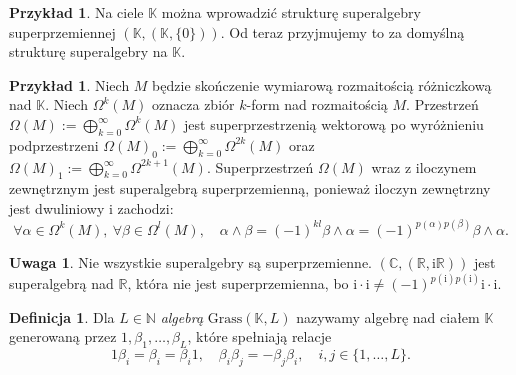 \documentclass[11pt,a4paper]{report}
\theoremstyle{definition}
\newtheorem{example}[theorem]{Przykład}
\newtheorem{definition}[theorem]{Definicja}
\newtheorem{remark}[theorem]{Uwaga}
\newcommand{\im}{\mathrm{i}}
\begin{document}
\begin{example}
 Na ciele $\mathbb{K}$ można wprowadzić strukturę superalgebry superprzemiennej $(\mathbb{K},(\mathbb{K},\{ 0 \}))$. Od teraz przyjmujemy to za domyślną strukturę superalgebry na $\mathbb{K}$.
\end{example}

\begin{example}
\label{superalgebra_form}
Niech $M$ będzie skończenie wymiarową rozmaitością różniczkową nad $\mathbb{K}$. Niech $\Omega^k(M)$ oznacza zbiór $k$-form nad rozmaitością $M$. Przestrzeń $\Omega(M) := \bigoplus_{k=0}^{\infty} \Omega^k(M)$ jest superprzestrzenią wektorową po wyróżnieniu podprzestrzeni $\Omega(M)_0 := \bigoplus_{k=0}^{\infty} \Omega^{2k}(M)$ oraz $\Omega(M)_1 := \bigoplus_{k=0}^{\infty} \Omega^{2k+1}(M)$. Superprzestrzeń $\Omega(M)$ wraz z iloczynem zewnętrznym jest superalgebrą superprzemienną, ponieważ iloczyn zewnętrzny jest dwuliniowy i zachodzi:
\begin{equation*}
\forall \alpha \in \Omega^{k}(M),\ \forall \beta \in \Omega^{l}(M), \quad \alpha \wedge \beta = (-1)^{kl} \beta \wedge \alpha = (-1)^{p(\alpha)p(\beta)} \beta \wedge \alpha.
\end{equation*}
\end{example}
\begin{remark}
Nie wszystkie superalgebry są superprzemienne. $(\mathbb{C},(\mathbb{R},\im \mathbb{R}))$ jest superalgebrą nad $\mathbb{R}$, która nie jest superprzemienna, bo $\im \cdot \im \neq (-1)^{p(\im)p(\im)}\im \cdot \im.$
\end{remark}
\begin{definition}
\label{def:grassmann_algebra}
Dla $L \in \mathbb{N}$ \textit{algebrą} $\mathrm{Grass}(\mathbb{K},L)$  nazywamy algebrę nad ciałem $\mathbb{K}$ generowaną przez $1, \beta_{1}, \ldots, \beta_{L}$, które spełniają relacje
\begin{equation}
1\beta_{i} = \beta_{i} = \beta_{i}1, \quad \beta_{i} \beta_{j} = - \beta_{j} \beta_{i}, \quad i,j \in \{ 1, \ldots, L \}.
\label{eq:grassmann_com}
\end{equation}
\end{definition}
\end{document}

